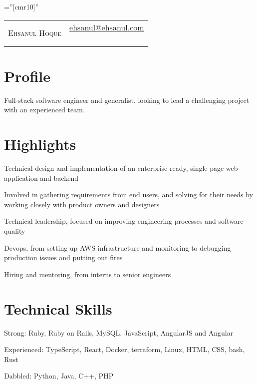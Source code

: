 \documentclass[a4paper,10pt]{article}
\newenvironment{packed-list}{
  \vspace{2pt}
  \begin{itemize}[itemsep=1pt,partopsep=0pt,leftmargin=1.5em]
    \setlength{\parskip}{0pt}
    \setlength{\partopsep}{9pt}
    \setlength{\parsep}{0pt}
    \setlength{\topsep}{0pt}
} {\end{itemize}}
\begin{document}
\pagestyle{empty} %

\font\fb=''[cmr10]'' %

\begin{tabular*}{\textwidth}{@{\extracolsep{\fill}} lr}
      {\color{Gray!50!black}\Huge \textsc{Ehsanul Hoque}}
      & \pbox{20cm}{
          {\large \href{mailto:ehsanul@ehsanul.com}{ehsanul@ehsanul.com}}\\
          \hspace*{\fill}{\large (415) 494-1172}\\
        }\\
\end{tabular*}

\section{Profile}
{\fontsize{12}{14}\selectfont  
  Full-stack software engineer and generalist, looking to lead a challenging
  project with an experienced team.}


\section{Highlights}
  \begin{packed-list}
    \item{ Technical design and implementation of an enterprise-ready, single-page web application and backend }
    \item{ Involved in gathering requirements from end users, and solving for their needs by working closely with product owners and designers }
    \item{ Technical leadership, focused on improving engineering processes and software quality }
    \item{ Devops, from setting up AWS infrastructure and monitoring to debugging production issues and putting out fires }
    \item{ Hiring and mentoring, from interns to senior engineers }
  \end{packed-list}


\section{Technical Skills}
  \begin{packed-list}
    \item{ Strong: Ruby, Ruby on Rails, MySQL, JavaScript, AngularJS and Angular }
    \item{ Experienced: TypeScript, React, Docker, terraform, Linux, HTML, CSS, bash, Rust }
    \item{ Dabbled: Python, Java, C++, PHP }
  \end{packed-list}
\end{document}
